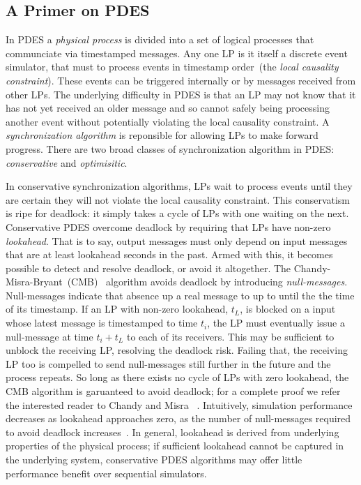\subsection{A Primer on PDES}

In PDES a \emph{physical process} is divided into a set of logical processes
that communciate via timestamped messages. Any one LP is it itself a discrete
event simulator, that must to process events in timestamp order~(the
\emph{local causality constraint}). These events can be triggered internally or
by messages received from other LPs.  The underlying difficulty in PDES is that
an LP may not know that it has not yet received an older message and so cannot
safely being processing another event without potentially violating the local
causality constraint. A \emph{synchronization algorithm} is reponsible for
allowing LPs to make forward progress. There are two broad classes of synchronization algorithm in PDES:
\emph{conservative} and \emph{optimisitic}.

In conservative synchronization algorithms, LPs wait to process events until
they are certain they will not violate the local causality constraint. This
conservatism is ripe for deadlock: it simply takes a cycle of LPs with one
waiting on the next. Conservative PDES overcome deadlock by requiring that LPs have non-zero
\emph{lookahead}. That is to say, output messages must only depend on input
messages that are at least lookahead seconds in the past. Armed with this,
it becomes possible to detect and resolve deadlock, or avoid it altogether.
The Chandy-Misra-Bryant~(CMB)~\cite{NullMessagesBryant, NullMessagesChandy} algorithm avoids deadlock by introducing
\emph{null-messages}. Null-messages indicate that absence up a real
message to up to until the the time of its timestamp. If an LP with non-zero lookahead, $t_{L}$, is blocked on a input whose latest
message is timestamped to time $t_{i}$, the LP must eventually issue a
null-message at time $t_{i} + t_{L}$ to each of its receivers. This may
be sufficient to unblock the receiving LP, resolving the deadlock risk. Failing that, the receiving LP too is compelled to
send null-messages still further in the future and the process repeats.
So long as there exists no cycle of LPs with zero lookahead, the CMB algorithm
is garuanteed to avoid deadlock; for a complete proof we refer the interested reader to Chandy and Misra~\cite{NullMessagesChandy} .
Intuitively, simulation performance decreases as lookahead approaches zero, as the number
of null-messages required to avoid deadlock increases~\cite{PDESFujimotoPrimer}.
In general, lookahead is derived from underlying properties of the
physical process; if sufficient lookahead cannot be
captured in the underlying system, conservative PDES algorithms may offer
little performance benefit over sequential simulators.

